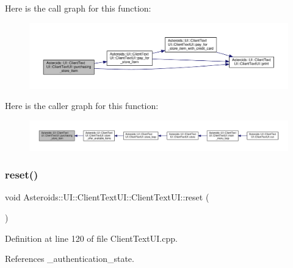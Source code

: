 Here is the call graph for this function\+:
\nopagebreak
\begin{figure}[H]
\begin{center}
\leavevmode
\includegraphics[width=350pt]{classAsteroids_1_1UI_1_1ClientTextUI_1_1ClientTextUI_a469a7cd3423794fa0ca7c34d95db5a10_cgraph}
\end{center}
\end{figure}
Here is the caller graph for this function\+:
\nopagebreak
\begin{figure}[H]
\begin{center}
\leavevmode
\includegraphics[width=350pt]{classAsteroids_1_1UI_1_1ClientTextUI_1_1ClientTextUI_a469a7cd3423794fa0ca7c34d95db5a10_icgraph}
\end{center}
\end{figure}
\mbox{\label{classAsteroids_1_1UI_1_1ClientTextUI_1_1ClientTextUI_a6efe3f748a4eee4913824be2aab9ab18}} 
\subsubsection{\texorpdfstring{reset()}{reset()}}
{\footnotesize\ttfamily void Asteroids\+::\+U\+I\+::\+Client\+Text\+U\+I\+::\+Client\+Text\+U\+I\+::reset (\begin{DoxyParamCaption}{ }\end{DoxyParamCaption})}



Definition at line 120 of file Client\+Text\+U\+I.\+cpp.



References \+\_\+authentication\+\_\+state.



